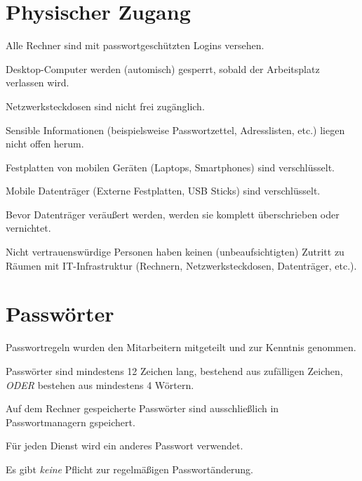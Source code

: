 \documentclass[10pt,a4paper]{article}
\begin{document}
\section{Physischer Zugang}
\begin{todolist}
\item{Alle Rechner sind mit passwortgeschützten Logins versehen.}
\item{Desktop-Computer werden (automisch) gesperrt, sobald der Arbeitsplatz verlassen wird.}
\item{Netzwerksteckdosen sind nicht frei zugänglich.}
\item{Sensible Informationen (beispielsweise Passwortzettel, Adresslisten, etc.) liegen nicht offen herum.}
\item{Festplatten von mobilen Geräten (Laptops, Smartphones) sind verschlüsselt.}
\item{Mobile Datenträger (Externe Festplatten, USB Sticks) sind verschlüsselt.}
\item{Bevor Datenträger veräußert werden, werden sie komplett überschrieben oder vernichtet.}
\item{Nicht vertrauenswürdige Personen haben keinen (unbeaufsichtigten) Zutritt zu Räumen mit IT-Infrastruktur (Rechnern, Netzwerksteckdosen, Datenträger, etc.).}
\end{todolist}

\section{Passwörter}
\begin{todolist}
\item{Passwortregeln wurden den Mitarbeitern mitgeteilt und zur Kenntnis genommen.}
\item{Passwörter sind mindestens 12 Zeichen lang, bestehend aus zufälligen Zeichen, \textit{ODER} bestehen aus mindestens 4 Wörtern.}
\item{Auf dem Rechner gespeicherte Passwörter sind ausschließlich in Passwortmanagern gspeichert.}
\item{Für jeden Dienst wird ein anderes Passwort verwendet.}
\item{Es gibt \textit{keine} Pflicht zur regelmäßigen Passwortänderung.}
\end{todolist}
\end{document}
